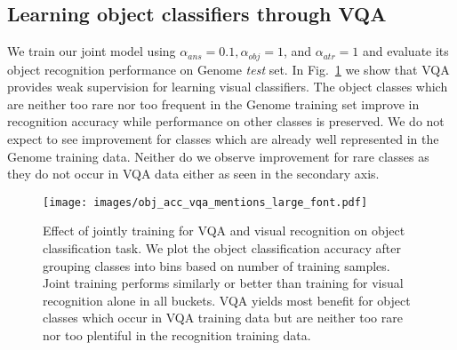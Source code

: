 \documentclass[10pt,twocolumn,letterpaper]{article}
\begin{document}
\subsection{Learning object classifiers through VQA}
We train our joint model using ${\alpha_{ans} = 0.1, \alpha_{obj} = 1}$, and $\alpha_{atr} = 1$ and evaluate its object recognition performance on Genome \textit{test} set. In Fig.~\ref{fig:obj_acc} we show that VQA provides weak supervision for learning visual classifiers. The object classes which are neither too rare nor too frequent in the Genome training set improve in recognition accuracy while performance on other classes is preserved. We do not expect to see improvement for classes which are already well represented in the Genome training data. Neither do we observe improvement for rare classes as they do not occur in VQA data either as seen in the secondary axis. 

\begin{figure}[t]
\begin{center}
\texttt{[image: images/obj\_acc\_vqa\_mentions\_large\_font.pdf]}
\vspace{-1cm}
\end{center}
  \caption{Effect of jointly training for VQA and visual recognition on object classification task. We plot the object classification accuracy after grouping classes into bins based on number of training samples. Joint training performs similarly or better than training for visual recognition alone in all buckets. VQA yields most benefit for object classes which occur in VQA training data but are neither too rare nor too plentiful in the recognition training data.}
\label{fig:obj_acc}
\end{figure} 
\end{document}
